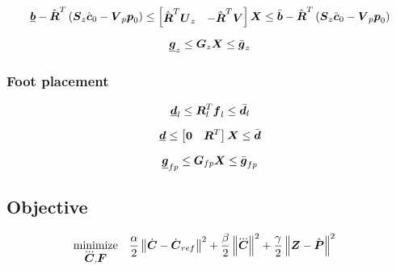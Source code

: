 \begin{equation*}
    \underline{\mbox{\boldmath $b$}} 
    -
    \hat{\mbox{\boldmath $R$}}^T
    \left(
        \mbox{\boldmath $S$}_z \hat{\mbox{\boldmath $c$}}_0 - \mbox{\boldmath $V$}_p \mbox{\boldmath $p$}_0
    \right)
    \le 
    \begin{bmatrix}
        \hat{\mbox{\boldmath $R$}}^T \mbox{\boldmath $U$}_z & - \hat{\mbox{\boldmath $R$}}^T \mbox{\boldmath $V$} \\
    \end{bmatrix}
    \mbox{\boldmath $X$}
    \le
    \bar{\mbox{\boldmath $b$}}
    -
    \hat{\mbox{\boldmath $R$}}^T
    \left(
        \mbox{\boldmath $S$}_z \hat{\mbox{\boldmath $c$}}_0 - \mbox{\boldmath $V$}_p \mbox{\boldmath $p$}_0
    \right)
\end{equation*}

\begin{equation*}
    \underline{\mbox{\boldmath $g$}}_z  \le  \mbox{\boldmath $G$}_z \mbox{\boldmath $X$}  \le  \bar{\mbox{\boldmath $g$}}_z
\end{equation*}

\subsubsection{Foot placement}
\begin{equation*}
    \underline{\mbox{\boldmath $d$}}_l \le \mbox{\boldmath $R$}_l^T \mbox{\boldmath $f$}_l \le \bar{\mbox{\boldmath $d$}_l}
\end{equation*}

\begin{equation*}
    \underline{\mbox{\boldmath $d$}} \le \begin{bmatrix} \mbox{\boldmath $0$} & \mbox{\boldmath $R$}^T \end{bmatrix} \mbox{\boldmath $X$} \le \bar{\mbox{\boldmath $d$}}
\end{equation*}

\begin{equation*}
    \underline{\mbox{\boldmath $g$}}_{fp}  \le  \mbox{\boldmath $G$}_{fp} \mbox{\boldmath $X$}  \le  \bar{\mbox{\boldmath $g$}}_{fp}
\end{equation*}



\subsection{Objective}
\begin{equation*}
\begin{split}
    \minimize{\cJerk, \FD}  & \frac{\alpha}{2} \norm{\cVel - \cVel_{ref}}^2 + 
                              \frac{\beta}{2}  \norm{\cJerk}^2 + 
                              \frac{\gamma}{2} \norm{\ZMP - \FPh}^2
\end{split}
\end{equation*}

